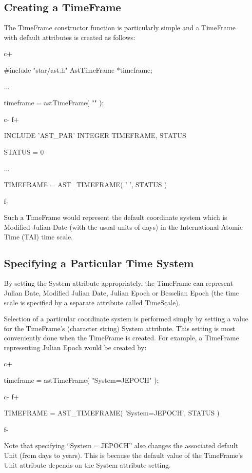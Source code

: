 \documentclass[twoside,11pt]{starlink}
\begin{document}
\subsection{Creating a TimeFrame}

The TimeFrame constructor function is particularly simple and a
TimeFrame with default attributes is created as follows:

c+
\small
\begin{terminalv}
#include "star/ast.h"
AstTimeFrame *timeframe;

...

timeframe = astTimeFrame( "" );
\end{terminalv}
\normalsize
c-
f+
\small
\begin{terminalv}
      INCLUDE 'AST_PAR'
      INTEGER TIMEFRAME, STATUS

      STATUS = 0

      ...

      TIMEFRAME = AST_TIMEFRAME( ' ', STATUS )
\end{terminalv}
\normalsize
f-

Such a TimeFrame would represent the default coordinate system which is
Modified Julian Date (with the usual units of days) in the International
Atomic Time (TAI) time scale.

\subsection{Specifying a Particular Time System}
By setting the System attribute appropriately, the TimeFrame can represent
Julian Date, Modified Julian Date, Julian Epoch or Besselian Epoch (the
time scale is specified by a separate attribute called TimeScale).

Selection of a particular coordinate system is performed simply by
setting a value for the TimeFrame's (character string) System
attribute. This setting is most conveniently done when the TimeFrame is
created. For example, a TimeFrame representing Julian Epoch would be created
by:

c+
\small
\begin{terminalv}
timeframe = astTimeFrame( "System=JEPOCH" );
\end{terminalv}
\normalsize
c-
f+
\small
\begin{terminalv}
      TIMEFRAME = AST_TIMEFRAME( 'System=JEPOCH', STATUS )
\end{terminalv}
\normalsize
f-

Note that specifying ``System$=$JEPOCH'' also changes the associated
default Unit (from days to years). This is because the default value
of the TimeFrame's Unit attribute depends on the System attribute setting.
\end{document}
